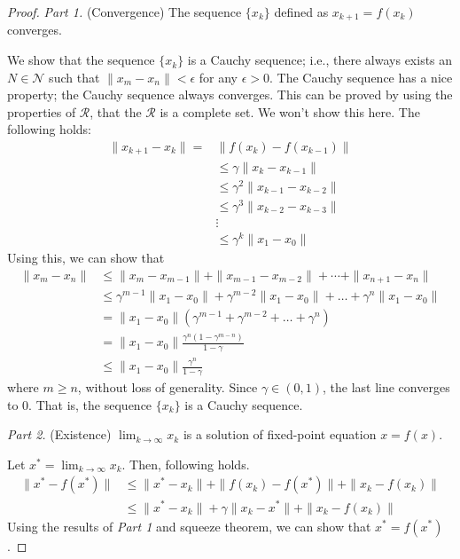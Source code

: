         \begin{proof}
            \textit{Part 1.} (Convergence) The sequence $\{x_k\}$ defined as $x_{k+1}=f(x_k)$ converges.

            We show that the sequence $\{x_k\}$ is a Cauchy sequence; i.e., there always exists an $N \in \mathcal{N}$ such that $\|x_m-x_n\| < \epsilon$ for any $\epsilon > 0$.
            The Cauchy sequence has a nice property; the Cauchy sequence always converges. This can be proved by using the properties of $\mathcal{R}$, that the $\mathcal{R}$ is a complete set.
            We won't show this here. The following holds:
            \begin{align}
                \|x_{k+1}-x_k\| = &\|f(x_k) - f(x_{k-1})\| \\
                                  &\leq \gamma \|x_k - x_{k-1}\| \\
                                  &\leq \gamma^2 \|x_{k-1}-x_{k-2}\| \\
                                  &\leq \gamma^3 \|x_{k-2}-x_{k-3}\| \\
                                  &\vdots \\
                                  &\leq \gamma^k \|x_1 - x_0\|
            \end{align}
            Using this, we can show that
            \begin{align}
                \|x_m - x_n\| &\leq \|x_m - x_{m-1}\| + \|x_{m-1} - x_{m-2}\| + \cdots + \|x_{n+1} - x_n\| \\
                              &\leq \gamma^{m-1}\|x_1-x_0\| + \gamma^{m-2}\|x_1-x_0\| + \dots + \gamma^{n}\|x_1-x_0\| \\
                              &= \|x_1-x_0\| (\gamma^{m-1} + \gamma^{m-2} + \dots + \gamma^n) \\
                              &= \|x_1-x_0\| \frac{\gamma^n(1-\gamma^{m-n})}{1-\gamma} \\
                              &\leq \|x_1-x_0\| \frac{\gamma^n}{1-\gamma}
            \end{align}
            where $m \geq n$, without loss of generality. Since $\gamma \in (0,1)$, the last line converges to 0. That is, the sequence $\{x_k\}$ is a Cauchy sequence.

            \textit{Part 2.} (Existence) $\lim_{k \to \infty} x_k$ is a solution of fixed-point equation $x=f(x)$.

            Let $x^* = \lim_{k \to \infty} x_k$. Then, following holds.
            \begin{align}
                \|x^*-f(x^*)\| &\leq \|x^*-x_k\| + \|f(x_k)-f(x^*)\| + \|x_k-f(x_k)\| \\
                               &\leq \|x^*-x_k\| + \gamma \|x_k - x^*\| + \|x_k - f(x_k)\|
            \end{align}
            Using the results of \textit{Part 1} and squeeze theorem, we can show that $x^*=f(x^*)$.


\end{proof}
